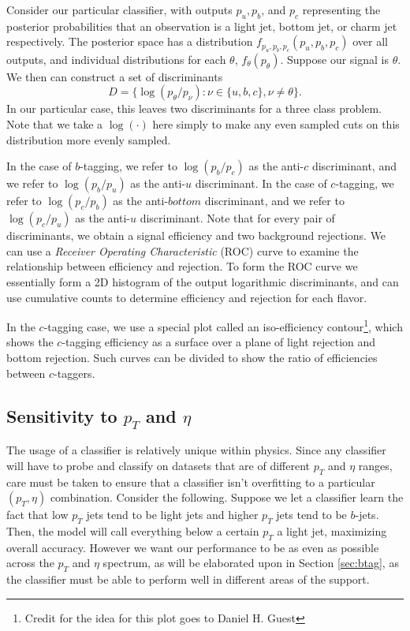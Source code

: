 Consider our particular classifier, with outputs $p_u, p_b$, and $p_c$ representing the posterior probabilities that an observation is a light jet, bottom jet, or charm jet respectively. The posterior space has a distribution $f_{p_u,p_b,p_c}(p_u, p_b, p_c)$ over all outputs, and individual distributions for each $\theta$, $f_\theta(p_\theta)$. Suppose our signal is $\theta$. We then can construct a set of discriminants
\begin{equation}
D = \{ \log(p_\theta / p_\nu) : \nu \in \{u,b,c\}, \nu \neq \theta \}.
\end{equation} 
In our particular case, this leaves two discriminants for a three class problem. Note that we take a $\log(\cdot)$ here simply to make any even sampled cuts on this distribution more evenly sampled. 

In the case of $b$-tagging, we refer to $\log(p_b/p_c)$ as the anti-$c$ discriminant, and we refer to $\log(p_b/p_u)$ as the anti-$u$ discriminant. In the case of $c$-tagging, we refer to $\log(p_c/p_b)$ as the anti-$bottom$ discriminant, and we refer to $\log(p_c/p_u)$ as the anti-$u$ discriminant. Note that for every pair of discriminants, we obtain a signal efficiency and two background rejections. We can use a \emph{Receiver Operating Characteristic} (ROC) curve to examine the relationship between efficiency and rejection. To form the ROC curve we essentially form a 2D histogram of the output logarithmic discriminants, and can use cumulative counts to determine efficiency and rejection for each flavor. 

In the $c$-tagging case, we use a special plot called an iso-efficiency contour\footnote{Credit for the idea for this plot goes to Daniel H. Guest}, which shows the $c$-tagging efficiency as a surface over a plane of light rejection and bottom rejection. Such curves can be divided to show the ratio of efficiencies between $c$-taggers.

\subsection{Sensitivity to $p_T$ and $\eta$}

The usage of a classifier is relatively unique within physics. Since any classifier will have to probe and classify on datasets that are of different $p_T$ and $\eta$ ranges, care must be taken to ensure that a classifier isn't overfitting to a particular $(p_T,\eta)$ combination. Consider the following. Suppose we let a classifier learn the fact that low $p_T$ jets tend to be light jets and higher $p_T$ jets tend to be $b$-jets. Then, the model will call everything below a certain $p_T$ a light jet, maximizing overall accuracy. However we want our performance to be as even as possible across the $p_T$ and $\eta$ spectrum, as will be elaborated upon in Section \ref{sec:btag}, as the classifier must be able to perform well in different areas of the support.

